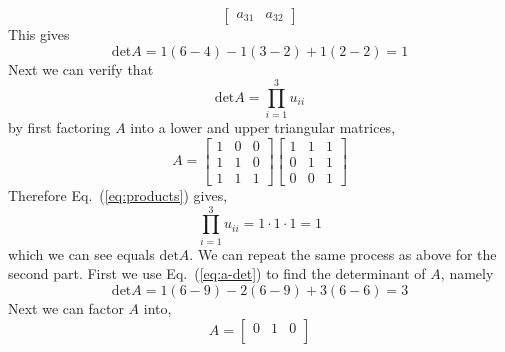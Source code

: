 \begin{enumerate}[label=\arabic*.]
\begin{mdframed}[style=MyFrame]
\begin{equation}
\begin{bmatrix}
                    a_{31}      &   a_{32}
                \end{bmatrix}
                \label{eq:a-det}
            \end{equation}
            This gives
            \begin{equation}
                \text{det}A =
                 1(6-4)-1(3-2)+1(2-2)= 1
            \end{equation}
            Next we can verify that 
            \begin{equation}
                \text{det}A =
                \prod_{i=1}^{3} u_{ii}
                \label{eq:products}
            \end{equation}
            by first factoring $A$ into a lower and upper triangular
            matrices, 
            \begin{equation}
                A = 
                \begin{bmatrix}
                    1       &   0   &   0   \\
                    1       &   1   &   0   \\
                    1       &   1   &   1   
                \end{bmatrix}
                \begin{bmatrix}
                    1   &   1   &   1   \\
                    0   &   1   &   1   \\
                    0   &   0   &   1
                \end{bmatrix}
            \end{equation}
            Therefore Eq.~(\ref{eq:products}) gives,
            \begin{equation}
                \prod_{i=1}^{3} u_{ii}
                =
                1   \cdot 1 \cdot 1 = 1
            \end{equation}
            which we can see equals $\text{det}A$. We can repeat the same
            process as above for the second part. First we use
            Eq.~(\ref{eq:a-det}) to find the determinant of $A$, namely
            \begin{equation}
                \text{det}A =
                1(6-9) - 2(6-9)  + 3(6-6) = 3
            \end{equation}
            Next we can factor $A$ into, 
            \begin{equation}
                A = 
                \begin{bmatrix}
                    0   &   1   &   0   \\

\end{bmatrix}
\end{equation}
\end{mdframed}
\end{enumerate}
